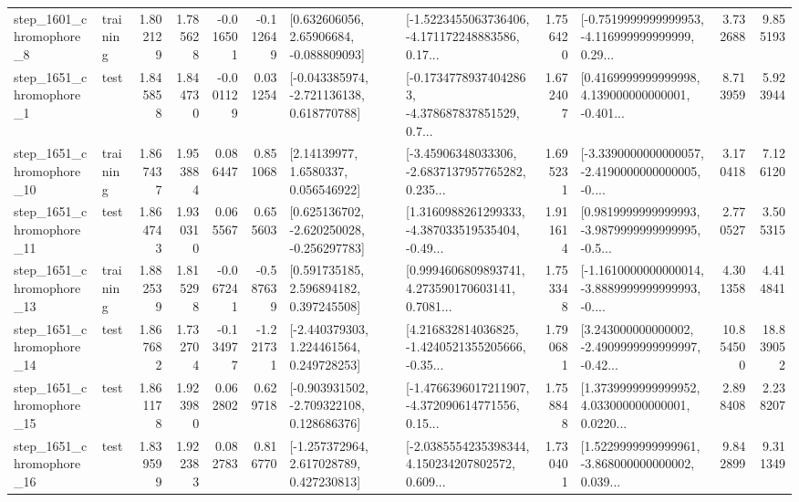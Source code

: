 \begin{tabular}{llrrrrllrlrr}
  step\_1601\_chromophore\_8 &  training &      1.802129 &    1.785628 &     -0.016501 & -0.112649 &     [0.632606056, 2.65906684, -0.088809093] &  [-1.5223455063736406, -4.171172248883586, 0.17... &       1.756420 &  [-0.7519999999999953, -4.116999999999999, 0.29... &            3.732688 &          9.855193 \\
  step\_1651\_chromophore\_1 &      test &      1.845858 &    1.844730 &     -0.001129 &  0.031254 &   [-0.043385974, -2.721136138, 0.618770788] &  [-0.17347789374042863, -4.378687837851529, 0.7... &       1.672407 &  [0.4169999999999998, 4.139000000000001, -0.401... &            8.713959 &          5.923944 \\
 step\_1651\_chromophore\_10 &  training &      1.867437 &    1.953884 &      0.086447 &  0.851068 &        [2.14139977, 1.6580337, 0.056546922] &  [-3.45906348033306, -2.6837137957765282, 0.235... &       1.695231 &  [-3.3390000000000057, -2.4190000000000005, -0.... &            3.170418 &          7.126120 \\
 step\_1651\_chromophore\_11 &      test &      1.864743 &    1.930310 &      0.065567 &  0.655603 &   [0.625136702, -2.620250028, -0.256297783] &  [1.3160988261299333, -4.387033519535404, -0.49... &       1.911614 &  [0.9819999999999993, -3.9879999999999995, -0.5... &            2.770527 &          3.505315 \\
 step\_1651\_chromophore\_13 &  training &      1.882539 &    1.815298 &     -0.067241 & -0.587639 &     [0.591735185, 2.596894182, 0.397245508] &  [0.9994606809893741, 4.273590170603141, 0.7081... &       1.753348 &  [-1.1610000000000014, -3.8889999999999993, -0.... &            4.301358 &          4.414841 \\
 step\_1651\_chromophore\_14 &      test &      1.867682 &    1.732704 &     -0.134977 & -1.221731 &    [-2.440379303, 1.224461564, 0.249728253] &  [4.216832814036825, -1.4240521355205666, -0.35... &       1.790681 &  [3.243000000000002, -2.4909999999999997, -0.42... &           10.854500 &         18.839052 \\
 step\_1651\_chromophore\_15 &      test &      1.861178 &    1.923980 &      0.062802 &  0.629718 &   [-0.903931502, -2.709322108, 0.128686376] &  [-1.4766396017211907, -4.372090614771556, 0.15... &       1.758848 &  [1.3739999999999952, 4.033000000000001, 0.0220... &            2.898408 &          2.238207 \\
 step\_1651\_chromophore\_16 &      test &      1.839599 &    1.922383 &      0.082783 &  0.816770 &    [-1.257372964, 2.617028789, 0.427230813] &  [-2.0385554235398344, 4.150234207802572, 0.609... &       1.730401 &  [1.5229999999999961, -3.868000000000002, 0.039... &            9.842899 &          9.311349 \\

\end{tabular}
